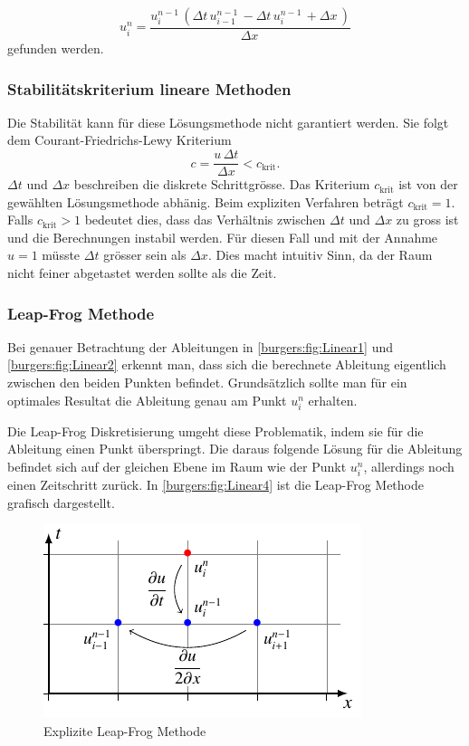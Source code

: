 	\begin{equation}
		u_{i}^{n} = \frac{u^{n-1}_{i}\, \left(\Delta{t}\, u^{n-1}_{i-1}\, - \Delta{t}\, u^{n-1}_{i}\, + \Delta{x}\,\right)}{\Delta{x}\,}
    	\label{burgers:eq_ex_sol_lin2}
	\end{equation}
gefunden werden.

\subsubsection{Stabilit\"atskriterium lineare Methoden}
	Die Stabilit\"at kann f\"ur diese L\"osungsmethode nicht garantiert werden.
	Sie folgt dem Courant-Friedrichs-Lewy Kriterium
	\begin{equation}
		  c = \frac{u \, \Delta t}{\Delta x} < c_{\text{krit}}.
	\end{equation}
	$ \Delta t$ und $\Delta x$  beschreiben die diskrete Schrittgr\"osse.
	Das Kriterium $c_{\text{krit}}$ ist von der gew\"ahlten L\"osungsmethode abh\"anig.
	Beim expliziten Verfahren beträgt $c_{\text{krit}} = 1$.
	Falls $c_{\text{krit}} > 1$ bedeutet dies, dass das Verh\"altnis zwischen $ \Delta t$ und $\Delta x$ zu gross ist und die Berechnungen instabil werden.
	F\"ur diesen Fall und mit der Annahme $u = 1$ m\"usste $ \Delta t$ gr\"osser sein als $\Delta x$.
	Dies macht intuitiv Sinn, da der Raum nicht feiner abgetastet werden sollte als die Zeit.



\subsubsection{Leap-Frog Methode}

	Bei genauer Betrachtung der Ableitungen in \autoref{burgers:fig:Linear1} und \autoref{burgers:fig:Linear2} erkennt man, dass sich die berechnete Ableitung eigentlich zwischen den beiden Punkten befindet.
	Grunds\"atzlich sollte man für ein optimales Resultat die Ableitung genau am Punkt $u_{i}^{n}$ erhalten.

	\medskip
	Die Leap-Frog Diskretisierung umgeht diese Problematik, indem sie f\"ur die Ableitung einen Punkt \"uberspringt.
	Die daraus folgende L\"osung für die Ableitung befindet sich auf der gleichen Ebene im Raum wie der Punkt $u_{i}^{n}$, allerdings noch einen Zeitschritt zurück.
	In \autoref{burgers:fig:Linear4} ist die Leap-Frog Methode grafisch dargestellt.

	     \begin{figure}
		\centering
		\includegraphics[height=.4\textwidth]{papers/burgers/BurgersEquation/tikz/linear4/linear4.pdf}
		\caption{Explizite Leap-Frog Methode}
		\label{burgers:fig:Linear4}
		\end{figure}

